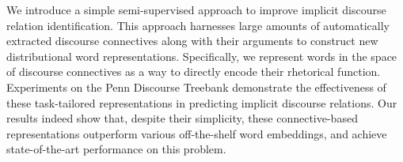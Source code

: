 We introduce a simple semi-supervised approach to improve implicit discourse relation identification. This approach harnesses large amounts of automatically extracted discourse connectives along with their arguments to construct new distributional word representations. Specifically, we represent words in the space of discourse connectives as a way to directly encode their rhetorical function. Experiments on the Penn Discourse Treebank demonstrate the effectiveness of these task-tailored representations in predicting implicit discourse relations. Our results indeed show that, despite their simplicity, these connective-based representations outperform various off-the-shelf word embeddings, and achieve state-of-the-art performance on this problem.
